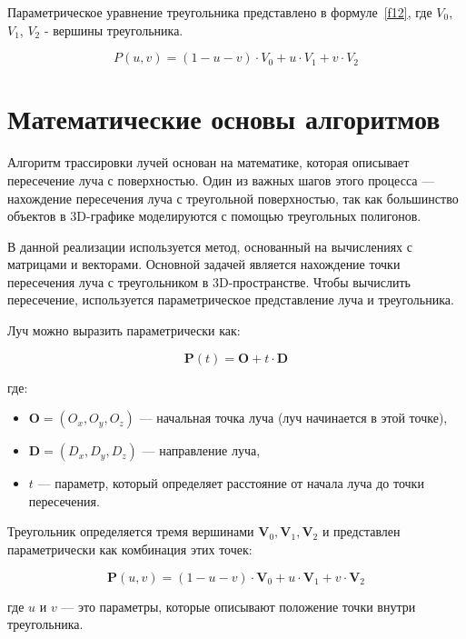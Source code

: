 Параметрическое уравнение треугольника представлено в формуле~\ref{f12}, где $V_{0}$, $V_{1}$, $V_{2}$  - вершины треугольника.

\begin{equation}
P(u, v) = (1 - u - v) \cdot V_{0} + u \cdot V_{1} + v \cdot V_{2}
\label{f12}
\end{equation}

\section{Математические основы алгоритмов}

Алгоритм трассировки лучей основан на математике, которая описывает пересечение луча с поверхностью. Один из важных шагов этого процесса — нахождение пересечения луча с треугольной поверхностью, так как большинство объектов в 3D-графике моделируются с помощью треугольных полигонов.

В данной реализации используется метод, основанный на вычислениях с матрицами и векторами. Основной задачей является нахождение точки пересечения луча с треугольником в 3D-пространстве. Чтобы вычислить пересечение, используется параметрическое представление луча и треугольника.

Луч можно выразить параметрически как:

\begin{equation}
\mathbf{P}(t) = \mathbf{O} + t \cdot \mathbf{D}
\end{equation}

где:
\begin{itemize}
    \item \(\mathbf{O} = (O_x, O_y, O_z)\) — начальная точка луча (луч начинается в этой точке),
    \item \(\mathbf{D} = (D_x, D_y, D_z)\) — направление луча,
    \item \(t\) — параметр, который определяет расстояние от начала луча до точки пересечения.
\end{itemize}

Треугольник определяется тремя вершинами \( \mathbf{V}_0, \mathbf{V}_1, \mathbf{V}_2 \) и представлен параметрически как комбинация этих точек:

\begin{equation}
\mathbf{P}(u, v) = (1 - u - v) \cdot \mathbf{V}_0 + u \cdot \mathbf{V}_1 + v \cdot \mathbf{V}_2
\end{equation}

где \(u\) и \(v\) — это параметры, которые описывают положение точки внутри треугольника.

